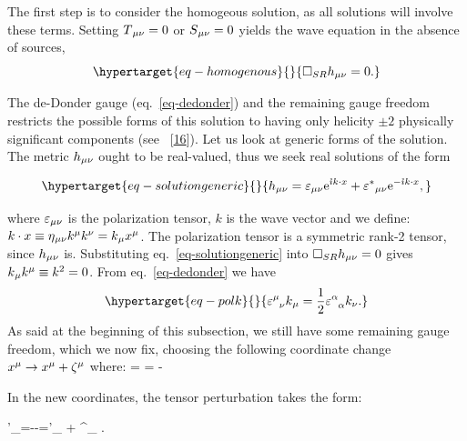 \documentclass[
  11pt,
  a4paper,
  DIV=11,
  numbers=noendperiod,
  twoside]{scrreprt}
\let\[\relax \let\]\relax %
\DeclareRobustCommand{\[}{\begin{equation}}
\DeclareRobustCommand{\]}{\end{equation}}
\begin{document}
The first step is to consider the homogeous solution, as all solutions
will involve these terms. Setting \(\SEco=0\) or \(\srcco=0\) yields the
wave equation in the absence of sources,
\begin{equation}\protect\hypertarget{eq-homogenous}{}{
   \SRDA \weakmet = 0 .
}\label{eq-homogenous}\end{equation}

The de-Donder gauge (eq.~\ref{eq-dedonder}) and the remaining gauge
freedom restricts the
possible forms of this solution to having only helicity \(\pm2\)
physically significant components (see
~{[}\protect\hyperlink{ref-Weinberg:1972}{16}{]}). Let us look at
generic forms of the solution. The metric \(\weakmet\) ought to be
real-valued, thus we seek real solutions of the form

\begin{equation}\protect\hypertarget{eq-solutiongeneric}{}{
    \weakmet = \polco \exp{\im k\cdot x} + \conjpolco \exp{-\im k\cdot x},
}\label{eq-solutiongeneric}\end{equation}

where \(\polco\) is the polarization tensor, \(k\) is the wave vector
and we define:
\(k\cdot x\equiv \mink \ct{k} \ct[\nu]{k} = \co{k} \ct{x}\). The
polarization tensor is a symmetric rank-2 tensor, since \(\weakmet\) is.
Substituting eq.~\ref{eq-solutiongeneric} into \(\SRDA\weakmet=0\) gives
\(\co{k} \ct{k} \equiv k^2=0\).  From eq.~\ref{eq-dedonder} we have
\begin{equation}\protect\hypertarget{eq-polk}{}{
    \polmix \co{k} = \frac{1}{2}\trpol k_\nu.
}\label{eq-polk}\end{equation} As said at the beginning of this
subsection, we still have some remaining gauge freedom, which we now
fix, choosing the following coordinate change
\(\ct{x}\to\ct{x}+\ct{\zeta}\) where: \[
\ct{\zeta}=\im {}     =  - \im {} 
\]

In the new coordinates, the tensor perturbation takes the form:

\[
\weakTensor'_{\mu\nu}=\weakmet--=\polTensor'_{\mu\nu}  + \polTensor^{\prime\ast}{}_{\mu\nu} .
\]
\end{document}
